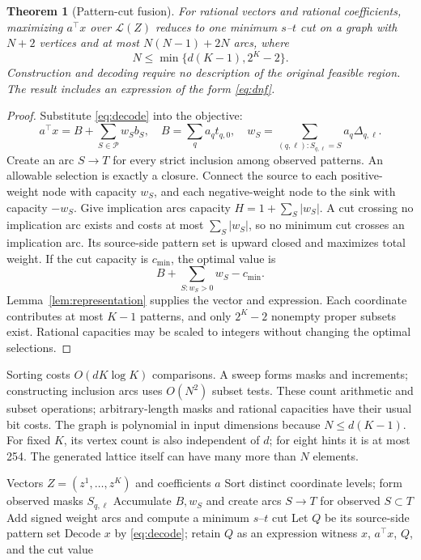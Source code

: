 \documentclass[10pt,letterpaper]{article}
\newtheorem{theorem}{Theorem}[section]
\newcommand{\lat}{\mathcal{L}}
\newcommand{\pat}{\mathcal{P}}
\newcommand{\LATCH}{\textsc{Latch}}
\begin{document}
\begin{theorem}[Pattern-cut fusion]
For rational vectors and rational coefficients, maximizing $a^\top x$ over $\lat(Z)$ reduces to one minimum $s$--$t$ cut on a graph with $N+2$ vertices and at most $N(N-1)+2N$ arcs, where
\begin{equation}
 N\leq\min\{d(K-1),2^K-2\}.
 \label{eq:size}
\end{equation}
Construction and decoding require no description of the original feasible region. The result includes an expression of the form \eqref{eq:dnf}.
\label{thm:cut}
\end{theorem}
\begin{proof}
Substitute \eqref{eq:decode} into the objective:
\begin{equation}
 a^\top x=B+\sum_{S\in\pat}w_Sb_S,\quad
 B=\sum_q a_qt_{q,0},\quad
 w_S=\sum_{(q,\ell):S_{q,\ell}=S}a_q\Delta_{q,\ell}.
 \label{eq:weights}
\end{equation}
Create an arc $S\to T$ for every strict inclusion among observed patterns. An allowable selection is exactly a closure. Connect the source to each positive-weight node with capacity $w_S$, and each negative-weight node to the sink with capacity $-w_S$. Give implication arcs capacity $H=1+\sum_S|w_S|$. A cut crossing no implication arc exists and costs at most $\sum_S|w_S|$, so no minimum cut crosses an implication arc. Its source-side pattern set is upward closed and maximizes total weight. If the cut capacity is $c_{\min}$, the optimal value is
\begin{equation}
 B+\sum_{S:w_S>0}w_S-c_{\min}.
 \label{eq:certificate}
\end{equation}
Lemma~\ref{lem:representation} supplies the vector and expression. Each coordinate contributes at most $K-1$ patterns, and only $2^K-2$ nonempty proper subsets exist. Rational capacities may be scaled to integers without changing the optimal selections.
\end{proof}

Sorting costs $O(dK\log K)$ comparisons. A sweep forms masks and increments; constructing inclusion arcs uses $O(N^2)$ subset tests. These count arithmetic and subset operations; arbitrary-length masks and rational capacities have their usual bit costs. The graph is polynomial in input dimensions because $N\leq d(K-1)$. For fixed $K$, its vertex count is also independent of $d$; for eight hints it is at most 254. The generated lattice itself can have many more than $N$ elements.

\begin{algorithm}[t]
\caption{\LATCH{} for a linear objective}
\begin{algorithmic}[1]
\Require Vectors $Z=(z^1,\ldots,z^K)$ and coefficients $a$
\State Sort distinct coordinate levels; form observed masks $S_{q,\ell}$
\State Accumulate $B,w_S$ and create arcs $S\to T$ for observed $S\subset T$
\State Add signed weight arcs and compute a minimum $s$--$t$ cut
\State Let $Q$ be its source-side pattern set
\State Decode $x$ by \eqref{eq:decode}; retain $Q$ as an expression witness
\State \Return $x$, $a^\top x$, $Q$, and the cut value
\end{algorithmic}
\end{algorithm}
\end{document}
